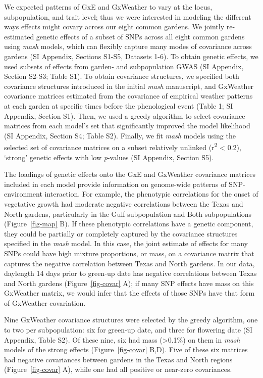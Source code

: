 \documentclass[
  9pt,
  twocolumn,
  twoside]{pnas-new}
\begin{document}
We expected patterns of GxE and GxWeather to vary at the locus,
subpopulation, and trait level; thus we were interested in modeling the
different ways effects might covary across our eight common gardens. We
jointly re-estimated genetic effects of a subset of SNPs across all
eight common gardens using \emph{mash} models, which can flexibly
capture many modes of covariance across gardens (SI Appendix, Sections
S1-S5, Datasets 1-6). To obtain genetic effects, we used subsets of
effects from garden- and subpopulation GWAS (SI Appendix, Section S2-S3;
Table S1). To obtain covariance structures, we specified both covariance
structures introduced in the initial \emph{mash} manuscript, and
GxWeather covariance matrices estimated from the covariance of empirical
weather patterns at each garden at specific times before the
phenological event (Table 1; SI Appendix, Section S1). Then, we used a
greedy algorithm to select covariance matrices from each model's set
that significantly improved the model likelihood (SI Appendix, Section
S4; Table S2). Finally, we fit \emph{mash} models using the selected set
of covariance matrices on a subset relatively unlinked
(r\textsuperscript{2} \textless{} 0.2), `strong' genetic effects with
low \emph{p}-values (SI Appendix, Section S5).

The loadings of genetic effects onto the GxE and GxWeather covariance
matrices included in each model provide information on genome-wide
patterns of SNP-environment interaction. For example, the phenotypic
correlations for the onset of vegetative growth had moderate negative
correlations between the Texas and North gardens, particularly in the
Gulf subpopulation and Both subpopulations (Figure~\ref{fig-map} B). If
these phenotypic correlations have a genetic component, they could be
partially or completely captured by the covariance structures specified
in the \emph{mash} model. In this case, the joint estimate of effects
for many SNPs could have high mixture proportions, or mass, on a
covariance matrix that captures the negative correlation between Texas
and North gardens. In our data, daylength 14 days prior to green-up date
has negative correlations between Texas and North gardens
(Figure~\ref{fig-covar} A); if many SNP effects have mass on this
GxWeather matrix, we would infer that the effects of those SNPs have
that form of GxWeather covariation.

Nine GxWeather covariance structures were selected by the greedy
algorithm, one to two per subpopulation: six for green-up date, and
three for flowering date (SI Appendix, Table S2). Of these nine, six had
mass (\textgreater0.1\%) on them in \emph{mash} models of the strong
effects (Figure~\ref{fig-covar} B,D). Five of these six matrices had
negative covariances between gardens in the Texas and North regions
(Figure~\ref{fig-covar} A), while one had all positive or near-zero
covariances.
\end{document}
